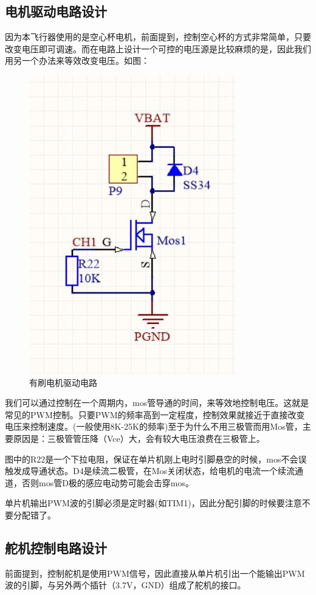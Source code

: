 \documentclass{article}
\begin{document}
\subsection{电机驱动电路设计}
因为本飞行器使用的是空心杯电机，前面提到，控制空心杯的方式非常简单，只要改变电压即可调速。而在电路上设计一个可控的电压源是比较麻烦的是，因此我们用另一个办法来等效改变电压。如图：
\begin{figure}[ht]
	\centering
	\includegraphics[scale=0.4]{mos.jpg}
	\caption{有刷电机驱动电路}
	\label{fig:label}
\end{figure}

我们可以通过控制在一个周期内，mos管导通的时间，来等效地控制电压。这就是常见的PWM控制。只要PWM的频率高到一定程度，控制效果就接近于直接改变电压来控制速度。(一般使用8K-25K的频率)至于为什么不用三极管而用Mos管，主要原因是：三极管管压降（Vce）大，会有较大电压浪费在三极管上。

图中的R22是一个下拉电阻，保证在单片机刚上电时引脚悬空的时候，mos不会误触发成导通状态。D4是续流二极管，在Mos关闭状态，给电机的电流一个续流通道，否则mos管D极的感应电动势可能会击穿mos。

单片机输出PWM波的引脚必须是定时器(如TIM1)，因此分配引脚的时候要注意不要分配错了。


\subsection{舵机控制电路设计}
前面提到，控制舵机是使用PWM信号，因此直接从单片机引出一个能输出PWM波的引脚，与另外两个插针（3.7V，GND）组成了舵机的接口。
\end{document}

